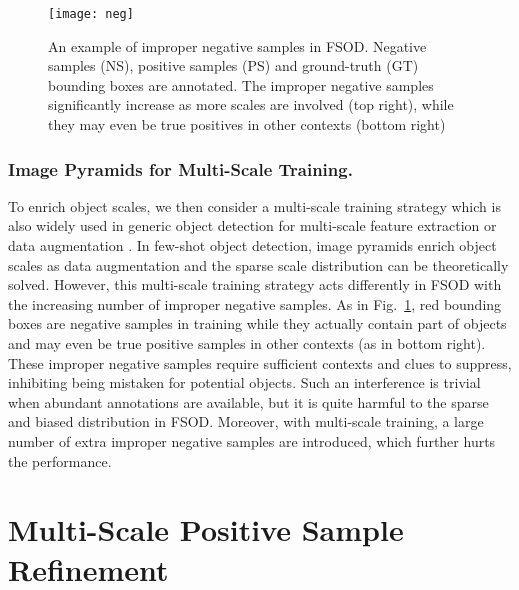 \documentclass[runningheads]{llncs}
\begin{document}
\begin{figure}
	\centering
	\texttt{[image: neg]}
	\caption{An example of improper negative samples in FSOD. Negative samples (NS), positive samples (PS) and ground-truth (GT) bounding boxes are annotated. The improper negative samples significantly increase as more scales are involved (top right), while they may even be true positives in other contexts (bottom right)}
	\label{fig:neg}
\end{figure}

\subsubsection{Image Pyramids for Multi-Scale Training.} 
To enrich object scales, we then consider a multi-scale training strategy which is also widely used in generic object detection for multi-scale feature extraction \cite{sppnet,fastrcnn} or data augmentation \cite{yolov2}. 
In few-shot object detection, image pyramids enrich object scales as data augmentation and the sparse scale distribution can be theoretically solved.
However, this multi-scale training strategy acts differently in FSOD with the increasing number of improper negative samples.
As in Fig.~\ref{fig:neg}, red bounding boxes are negative samples in training while they actually contain part of objects and may even be true positive samples in other contexts (as in bottom right).
These improper negative samples require sufficient contexts and clues to suppress, inhibiting being mistaken for potential objects. 
Such an interference is trivial when abundant annotations are available, but it is quite harmful to the sparse and biased distribution in FSOD.
Moreover, with multi-scale training, a large number of extra improper negative samples are introduced, which further hurts the performance.

\section{Multi-Scale Positive Sample Refinement}
\end{document}
